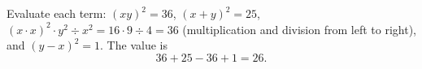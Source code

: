 Evaluate each term: $(xy)^2=36$, $(x+y)^2=25$, $(x\cdot x)^2\cdot y^2\div x^2=16\cdot9\div4=36$ (multiplication and division from left to right), and $(y-x)^2=1$. The value is
\[36+25-36+1=\boxed{26}.\]
